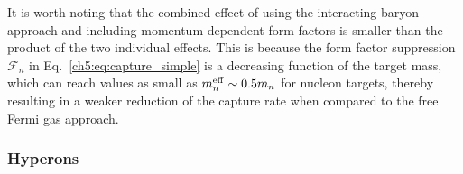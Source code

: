 It is worth noting that the combined effect of using the interacting baryon approach and including momentum-dependent form factors is smaller than the product of the two individual effects. This is because the form factor suppression $\mathcal{F}_n$ in Eq.~\ref{ch5:eq:capture_simple} is a decreasing function of the target mass, which can reach values as small as $m_n^{\rm eff}\sim0.5m_n$ for nucleon targets, thereby resulting in a weaker reduction of the capture rate when compared to the free Fermi gas approach. 





\subsubsection{Hyperons}
\label{sec:capresexotic}

